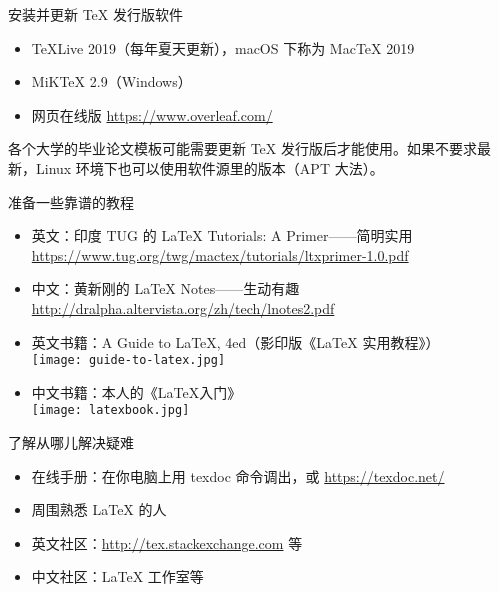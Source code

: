 \begin{frame}{安装并更新 \TeX{} 发行版软件}
\begin{itemize}
  \item \TeX Live 2019（每年夏天更新），macOS 下称为 MacTeX 2019
  \item MiKTeX 2.9（Windows）
  \item 网页在线版 \url{https://www.overleaf.com/}
\end{itemize}
各个大学的毕业论文模板可能需要更新 \TeX{} 发行版后才能使用。如果不要求最新，Linux 环境下也可以使用软件源里的版本（APT 大法）。
\end{frame}

\begin{frame}{准备一些靠谱的教程}
\begin{itemize}
\item 英文：印度 TUG 的 \LaTeX{} Tutorials: A Primer——简明实用\\
{\small\url{https://www.tug.org/twg/mactex/tutorials/ltxprimer-1.0.pdf}}
\item 中文：黄新刚的 \LaTeX{} Notes——生动有趣
\url{http://dralpha.altervista.org/zh/tech/lnotes2.pdf}
\item 英文书籍：A Guide to \LaTeX, 4ed（影印版《LaTeX 实用教程》）\\
\texttt{[image: guide-to-latex.jpg]}
\item 中文书籍：本人的《\LaTeX 入门》\\
\texttt{[image: latexbook.jpg]}
\end{itemize}
\end{frame}

\begin{frame}{了解从哪儿解决疑难}
\begin{itemize}
\item 在线手册：在你电脑上用 texdoc 命令调出，或 \url{https://texdoc.net/}
\item 周围熟悉 \LaTeX{} 的人
\item 英文社区：\url{http://tex.stackexchange.com} 等
\item 中文社区：\LaTeX{} 工作室等
\end{itemize}

\end{frame}
